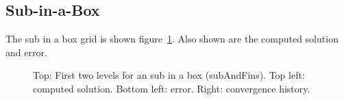\documentclass{article}
\begin{document}


\subsection{Sub-in-a-Box}

  The sub in a box grid is shown figure~\ref{fig:sub}. Also shown are the computed
solution and error.


{
\newcommand{\figWidth}{10cm}
\newcommand{\trimfig}[2]{\trimPlotb{#1}{#2}{.0}{.0}{.2}{.2}}
\newcommand{\figWidtha}{7.cm}
\newcommand{\trimfiga}[2]{\trimPlotb{#1}{#2}{.0}{.0}{. }{.0}}
\begin{figure}[hbt]
\begin{center}
\end{center}
\caption{Top: First two levels for an sub in a box (subAndFins). 
Top left: computed solution. Bottom left: error. Right: convergence history.}
\label{fig:sub}
\end{figure}
}
\end{document}
